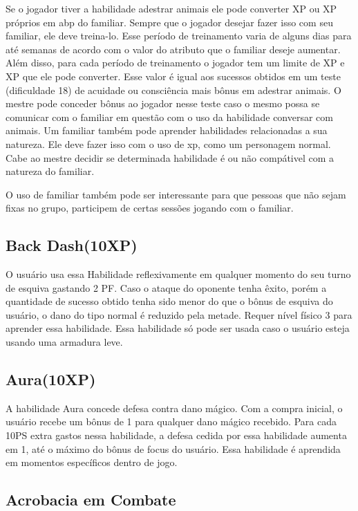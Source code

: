 Se o jogador tiver a habilidade adestrar animais ele pode converter XP ou XP próprios em abp do familiar. Sempre que o jogador desejar fazer isso com seu familiar, ele deve treina-lo. Esse período de treinamento varia de alguns dias para até semanas de acordo com o valor do atributo que o familiar deseje aumentar. Além disso, para cada período de treinamento o jogador tem um limite de XP e XP que ele pode converter. Esse valor é igual aos sucessos obtidos em um teste (dificuldade 18) de acuidade ou consciência mais bônus em adestrar animais. O mestre pode conceder bônus ao jogador nesse teste caso o mesmo possa se comunicar com o familiar em questão com o uso da habilidade conversar com animais. Um familiar também pode aprender habilidades relacionadas a sua natureza. Ele deve fazer isso com o uso de xp, como um personagem normal. Cabe ao mestre decidir se determinada habilidade é ou não compátivel com a natureza do familiar.

O uso de familiar também pode ser interessante para que pessoas que não sejam fixas no grupo, participem de certas sessões jogando com o familiar.



\subsection {Back Dash(10XP)}
O usuário usa essa Habilidade reflexivamente em qualquer momento do seu turno de esquiva gastando 2 PF. Caso o ataque do oponente tenha êxito, porém a quantidade de sucesso obtido tenha sido menor do que o bônus de esquiva do usuário, o dano do tipo normal é reduzido pela metade. Requer nível físico 3 para aprender essa habilidade. Essa habilidade só pode ser usada caso o usuário esteja usando uma armadura leve.

\subsection {Aura(10XP)}
A habilidade Aura concede defesa contra dano mágico. Com a compra inicial, o usuário recebe um bônus de 1 para qualquer dano mágico recebido. Para cada 10PS extra gastos nessa habilidade, a defesa cedida por essa habilidade aumenta em 1, até o máximo do bônus de focus do usuário. Essa habilidade é aprendida em momentos específicos dentro de jogo.


\subsection{Acrobacia em Combate}

